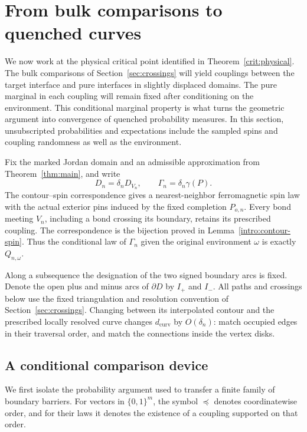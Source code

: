 \section{From bulk comparisons to quenched curves}
\label{sec:curves}

We now work at the physical critical point identified in
Theorem~\ref{crit:physical}.  The bulk comparisons of
Section~\ref{sec:crossings} will yield couplings between the target
interface and pure interfaces in slightly displaced domains.  The pure
marginal in each coupling will remain fixed after conditioning on the
environment.  This conditional marginal property is what turns the
geometric argument into convergence of quenched probability measures.
In this section, unsubscripted probabilities and expectations include
the sampled spins and coupling randomness as well as the environment.

Fix the marked Jordan domain and an admissible approximation from
Theorem~\ref{thm:main}, and write
\[
 D_n=\delta_nD_{V_n},\qquad
 \Gamma_n=\delta_n\gamma(P).
\]
The contour--spin correspondence gives a nearest-neighbor ferromagnetic
spin law with the actual exterior pins induced by the fixed completion
$P_{o,n}$.  Every bond meeting $V_n$, including a bond crossing its boundary,
retains its prescribed coupling.  The correspondence is the bijection
proved in Lemma~\ref{intro:contour-spin}.  Thus the conditional law of $\Gamma_n$ given the original
environment $\omega$ is exactly $Q_{n,\omega}$.

Along a subsequence the designation of the two signed boundary arcs is
fixed.  Denote the open plus and minus arcs of $\partial D$ by $I_+$ and
$I_-$.  All paths and crossings below use the fixed triangulation and
resolution convention of Section~\ref{sec:crossings}.  Changing between
its interpolated contour and the prescribed locally resolved curve
changes $d_{\mathrm{curv}}$ by $O(\delta_n)$: match occupied edges in their
traversal order, and match the connections inside the vertex disks.

\subsection{A conditional comparison device}

We first isolate the probability argument used to transfer a finite
family of boundary barriers.  For vectors in $\{0,1\}^m$, the symbol
$\preceq$ denotes coordinatewise order, and for their laws it denotes
the existence of a coupling supported on that order.

